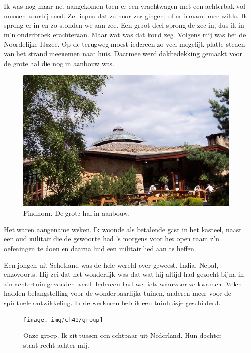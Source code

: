\documentclass[12pt,twoside, openright]{memoir}
\begin{document}
Ik was nog maar net aangekomen toen er een vrachtwagen met een achterbak vol mensen voorbij reed. Ze riepen dat ze naar zee gingen, of er iemand mee wilde. Ik sprong er in en zo stonden we aan zee. Een groot deel sprong de zee in, dus ik in m’n onderbroek erachteraan. Maar wat was dat koud zeg. Volgens mij was het de Noordelijke IJszee. Op de terugweg moest iedereen zo veel mogelijk platte stenen van het strand meenemen naar huis. Daarmee werd dakbedekking gemaakt voor de grote hal die nog in aanbouw was. 

\begin{figure}
\centering
\includegraphics[width=\textwidth]{img/ch43/hall}
\caption*{\footnotesize Findhorn. De grote hal in aanbouw.}
\end{figure}

Het waren aangename weken. Ik woonde als betalende gast in het kasteel, naast een oud militair die de gewoonte had ’s morgens voor het open raam z’n oefeningen te doen en daarna luid een militair lied aan te heffen. 

Een jongen uit Schotland was de hele wereld over geweest. India, Nepal, enzovoorts. Hij zei dat het wonderlijk was dat wat hij altijd had gezocht bijna in z’n achtertuin gevonden werd. Iedereen had wel iets waarvoor ze kwamen. Velen hadden belangstelling voor de wonderbaarlijke tuinen, anderen meer voor de spirituele ontwikkeling. In de werkuren heb ik een tuinhuisje geschilderd. 

\begin{figure}
\centering
\texttt{[image: img/ch43/group]}
\caption*{\footnotesize Onze groep. Ik zit tussen een echtpaar uit Nederland. Hun dochter staat recht achter mij.}
\end{figure}
\end{document}
